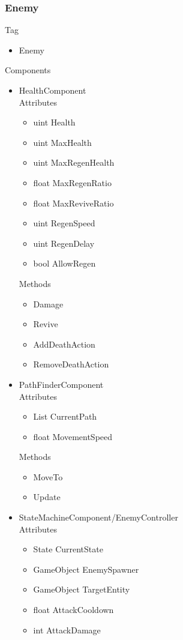 \documentclass[11pt]{article}
\begin{document}
\subsubsection{Enemy}
Tag
\begin{itemize}
\item Enemy
\end{itemize}
Components
\begin{itemize}
\item HealthComponent
\\Attributes
\begin{itemize}
\item uint Health
\item uint MaxHealth
\item uint MaxRegenHealth
\item float MaxRegenRatio
\item float MaxReviveRatio
\item uint RegenSpeed
\item uint RegenDelay
\item bool AllowRegen
\end{itemize}
Methods
\begin{itemize}
\item Damage
\item Revive
\item AddDeathAction
\item RemoveDeathAction
\end{itemize}
\item PathFinderComponent
\\Attributes
\begin{itemize}
\item List CurrentPath
\item float MovementSpeed
\end{itemize}
Methods
\begin{itemize}
\item MoveTo
\item Update
\end{itemize}
\item StateMachineComponent/EnemyController
\\Attributes
\begin{itemize}
\item State CurrentState
\item GameObject EnemySpawner
\item GameObject TargetEntity
\item float AttackCooldown
\item int AttackDamage 

\end{itemize}
\end{itemize}
\end{document}
